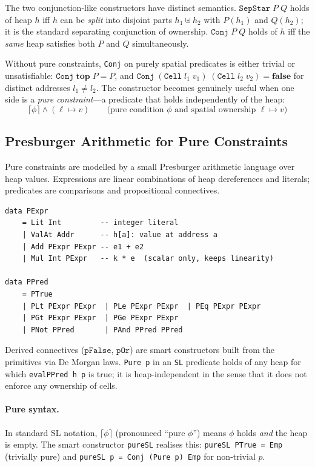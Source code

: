 \documentclass[acmsmall,screen]{acmart}
\begin{document}
The two conjunction-like constructors have distinct semantics.
$\mathtt{SepStar}\;P\;Q$ holds of heap $h$ iff $h$ can be \emph{split}
into disjoint parts $h_1 \uplus h_2$ with $P(h_1)$ and $Q(h_2)$;
it is the standard separating conjunction of ownership.
$\mathtt{Conj}\;P\;Q$ holds of $h$ iff the \emph{same} heap satisfies
both $P$ and $Q$ simultaneously.

Without pure constraints, \lstinline{Conj} on purely spatial predicates
is either trivial or unsatisfiable:
$\mathtt{Conj}\;\mathbf{top}\;P = P$, and
$\mathtt{Conj}\;(\mathtt{Cell}\;l_1\;v_1)\;(\mathtt{Cell}\;l_2\;v_2) =
\mathbf{false}$ for distinct addresses $l_1 \neq l_2$.
The constructor becomes genuinely useful when one side is a \emph{pure
constraint}---a predicate that holds independently of the heap:
\[
  \lceil\phi\rceil \wedge (\ell \mapsto v)
  \qquad\text{(pure condition $\phi$ and spatial ownership $\ell \mapsto v$)}
\]

\subsection{Presburger Arithmetic for Pure Constraints}

Pure constraints are modelled by a small Presburger arithmetic language
over heap values.
Expressions are linear combinations of heap dereferences and literals;
predicates are comparisons and propositional connectives.

\begin{lstlisting}
data PExpr
    = Lit Int         -- integer literal
    | ValAt Addr      -- h[a]: value at address a
    | Add PExpr PExpr -- e1 + e2
    | Mul Int PExpr   -- k * e  (scalar only, keeps linearity)

data PPred
    = PTrue
    | PLt PExpr PExpr  | PLe PExpr PExpr  | PEq PExpr PExpr
    | PGt PExpr PExpr  | PGe PExpr PExpr
    | PNot PPred       | PAnd PPred PPred
\end{lstlisting}

\noindent
Derived connectives ($\mathtt{pFalse}$, $\mathtt{pOr}$) are smart
constructors built from the primitives via De Morgan laws.
\lstinline{Pure p} in an \lstinline{SL} predicate holds of any heap
for which \lstinline{evalPPred h p} is true; it is heap-independent in
the sense that it does not enforce any ownership of cells.

\paragraph{Pure syntax.}
In standard SL notation, $\lceil\phi\rceil$ (pronounced ``pure $\phi$'')
means $\phi$ holds \emph{and} the heap is empty.
The smart constructor \lstinline{pureSL} realises this:
\lstinline{pureSL PTrue = Emp} (trivially pure) and
\lstinline{pureSL p = Conj (Pure p) Emp} for non-trivial $p$.
\end{document}
